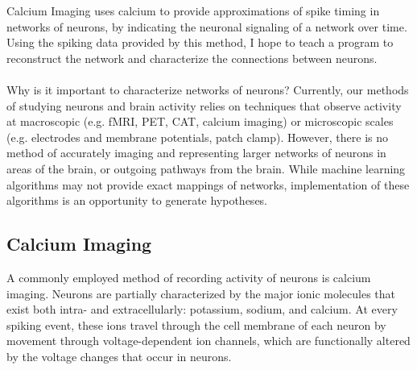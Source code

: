\documentclass{article}
\begin{document}
Calcium Imaging uses calcium to provide approximations of spike timing in networks of neurons, by indicating the neuronal signaling of a network over time. Using the spiking data provided by this method, I hope to teach a program to reconstruct the network and characterize the connections between neurons.\\
\\
Why is it important to characterize networks of neurons? Currently, our methods of studying neurons and brain activity relies on techniques that observe activity at macroscopic (e.g. fMRI, PET, CAT, calcium imaging) or microscopic scales (e.g. electrodes and membrane potentials, patch clamp). However, there is no method of accurately imaging and representing larger networks of neurons in areas of the brain, or outgoing pathways from the brain. While machine learning algorithms may not provide exact mappings of networks, implementation of these algorithms is an opportunity to generate hypotheses.\par

\subsection{Calcium Imaging}
A commonly employed method of recording activity of neurons is calcium imaging. Neurons are partially characterized by the major ionic molecules that exist both intra- and extracellularly: potassium, sodium, and calcium. At every spiking event, these ions travel through the cell membrane of each neuron by movement through voltage-dependent ion channels, which are functionally altered by the voltage changes that occur in neurons.\par
\end{document}
